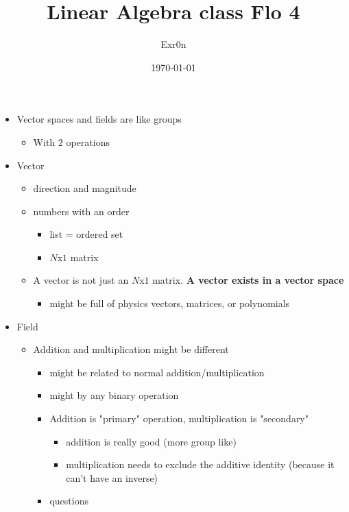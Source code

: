 \documentclass[letterpaper]{article}
\author{Exr0n}
\date{\today}
\title{Linear Algebra class Flo 4}
\renewcommand{\tableofcontents}{}
\begin{document}
\tableofcontents

\begin{itemize}
\item Vector spaces and fields are like groups

\begin{itemize}
\item With 2 operations
\end{itemize}

\item Vector

\begin{itemize}
\item direction and magnitude
\item numbers with an order

\begin{itemize}
\item list = ordered set
\item \(N\)x\(1\) matrix
\end{itemize}

\item A vector is not just an \(N\)x\(1\) matrix. \textbf{A vector exists in a
vector space}

\begin{itemize}
\item might be full of physics vectors, matrices, or polynomials
\end{itemize}
\end{itemize}

\item Field

\begin{itemize}
\item Addition and multiplication might be different

\begin{itemize}
\item might be related to normal addition/multiplication
\item might by any binary operation
\item Addition is "primary" operation, multiplication is "secondary"

\begin{itemize}
\item addition is really good (more group like)
\item multiplication needs to exclude the additive identity (because
it can't have an inverse)
\end{itemize}

\item questions


\end{itemize}
\end{itemize}
\end{itemize}
\end{document}
